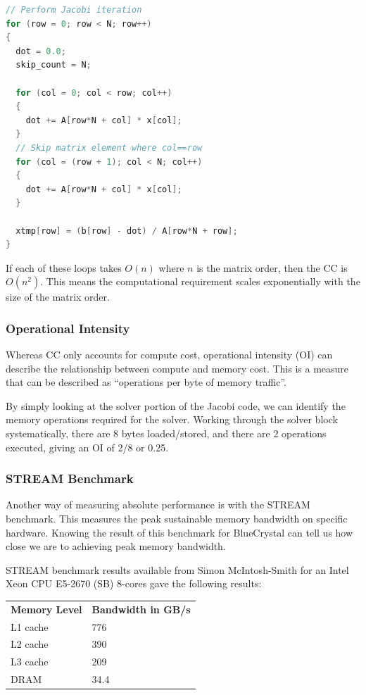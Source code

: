\documentclass{article}
\begin{document}
\begin{lstlisting}[language=C]
// Perform Jacobi iteration
for (row = 0; row < N; row++)
{
  dot = 0.0;
  skip_count = N;

  for (col = 0; col < row; col++)
  {
    dot += A[row*N + col] * x[col];
  }
  // Skip matrix element where col==row
  for (col = (row + 1); col < N; col++)
  {
    dot += A[row*N + col] * x[col];
  }

  xtmp[row] = (b[row] - dot) / A[row*N + row];
}
\end{lstlisting}

If each of these loops takes \(O(n)\) where \(n\) is the matrix
order, then the CC is \(O(n^2)\). This means the computational
requirement scales exponentially with the size of the matrix order.

\subsubsection{Operational Intensity}
Whereas CC only accounts for compute cost, operational intensity (OI)
can describe the relationship between compute and memory cost. This is
a measure that can be described as ``operations per byte of memory
traffic''.

By simply looking at the solver portion of the Jacobi code, we can
identify the memory operations required for the solver. Working
through the solver block systematically, there are 8 bytes
loaded/stored, and there are 2 operations executed, giving an OI of
2/8 or 0.25.

\subsubsection{STREAM Benchmark}
Another way of measuring absolute performance is with the STREAM
benchmark. This measures the peak sustainable memory bandwidth on
specific hardware. Knowing the result of this benchmark for
BlueCrystal can tell us how close we are to achieving peak memory
bandwidth.

STREAM benchmark results available from Simon McIntosh-Smith for an
Intel Xeon CPU E5-2670 (SB) 8-cores gave the following results:

\begin{center}
  \begin{tabular}{|l|l|}
    \hline
    \textbf{Memory Level} & \textbf{Bandwidth in GB/s} \\
    L1 cache & 776 \\
    L2 cache & 390 \\
    L3 cache & 209 \\
    DRAM & 34.4 \\
    \hline
  \end{tabular}
\end{center}
\end{document}
